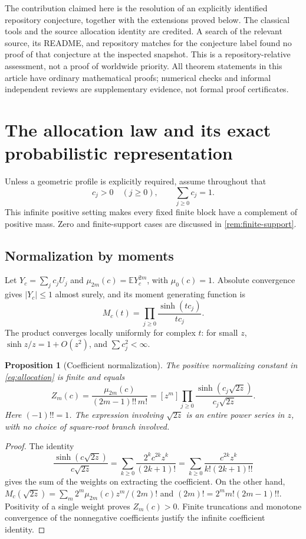 \documentclass[11pt,a4paper]{article}
\numberwithin{equation}{section}
\newtheorem{proposition}[theorem]{Proposition}
\theoremstyle{definition}
\theoremstyle{remark}
\newcommand{\E}{\mathbb E}
\begin{document}
The contribution claimed here is the resolution of an explicitly identified
repository conjecture, together with the extensions proved below. The
classical tools and the source allocation identity are credited. A search
of the relevant source, its README, and repository matches for the
conjecture label found no proof of that conjecture at the inspected
snapshot. This is a repository-relative assessment, not a proof of worldwide
priority. All theorem statements in this article have ordinary mathematical
proofs; numerical checks and informal independent reviews are supplementary
evidence, not formal proof certificates.

\section{The allocation law and its exact probabilistic representation}
\label{sec:model}

Unless a geometric profile is explicitly required, assume throughout that
\begin{equation}
c_j>0\quad(j\ge0),\qquad \sum_{j\ge0}c_j=1.
\label{eq:general-profile}
\end{equation}
This infinite positive setting makes every fixed finite block have a
complement of positive mass. Zero and finite-support cases are discussed in
\cref{rem:finite-support}.

\subsection{Normalization by moments}
Let $Y_c=\sum_jc_jU_j$ and $\mu_{2m}(c)=\E Y_c^{2m}$, with
$\mu_0(c)=1$. Absolute convergence gives $|Y_c|\le1$ almost surely, and
its moment generating function is
\begin{equation}
M_c(t)=\prod_{j\ge0}\frac{\sinh(tc_j)}{tc_j}.
\label{eq:mgf}
\end{equation}
The product converges locally uniformly for complex $t$: for small $z$,
$\sinh z/z=1+O(z^2)$, and $\sum c_j^2<\infty$.

\begin{proposition}[Coefficient normalization]
\label{prop:normalization}
The positive normalizing constant in \cref{eq:allocation} is finite and
equals
\begin{equation}
Z_m(c)=\frac{\mu_{2m}(c)}{(2m-1)!!\,m!}
=[z^m]\prod_{j\ge0}
 \frac{\sinh(c_j\sqrt{2z})}{c_j\sqrt{2z}}.
\label{eq:partition}
\end{equation}
Here $(-1)!!=1$. The expression involving $\sqrt{2z}$ is an entire
power series in $z$, with no choice of square-root branch involved.
\end{proposition}
\begin{proof}
The identity
\[
\frac{\sinh(c\sqrt{2z})}{c\sqrt{2z}}
=\sum_{k\ge0}\frac{2^kc^{2k}z^k}{(2k+1)!}
=\sum_{k\ge0}\frac{c^{2k}z^k}{k!(2k+1)!!}
\]
gives the sum of the weights on extracting the coefficient. On the other
hand, $M_c(\sqrt{2z})=\sum_m2^m\mu_{2m}(c)z^m/(2m)!$ and
$(2m)!=2^mm!(2m-1)!!$. Positivity of a single weight proves $Z_m(c)>0$.
Finite truncations and monotone convergence of the nonnegative coefficients
justify the infinite coefficient identity.
\end{proof}
\end{document}
